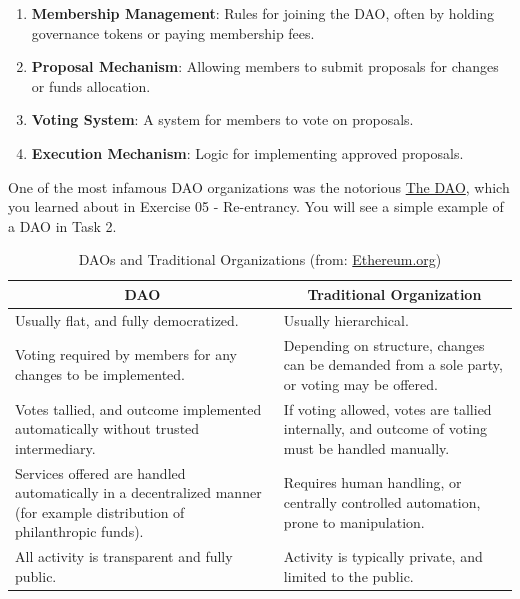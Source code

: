 \documentclass[12pt]{article}
\begin{document}
\begin{enumerate}
    \item \textbf{Membership Management}: Rules for joining the DAO, often by holding governance tokens or paying membership fees.
    \item \textbf{Proposal Mechanism}: Allowing members to submit proposals for changes or funds allocation.
    \item \textbf{Voting System}: A system for members to vote on proposals.
    \item \textbf{Execution Mechanism}: Logic for implementing approved proposals.
\end{enumerate}

\noindent
One of the most infamous DAO organizations was the notorious \href{https://en.wikipedia.org/wiki/The_DAO}{The DAO}, which you learned about in Exercise 05 - Re-entrancy. You will see a simple example of a DAO in Task 2.

\begin{table}[H]
    \centering
    \footnotesize
    \begin{tabular}{|p{}|p{}|}
        \hline
        \multicolumn{1}{|c|}{\textbf{DAO}}                                                                                      & \multicolumn{1}{c|}{\textbf{Traditional Organization}}                                           \\
        \hline
        Usually flat, and fully democratized.                                                                                   & Usually hierarchical.                                                                            \\
        \hline
        Voting required by members for any changes to be implemented.                                                           & Depending on structure, changes can be demanded from a sole party, or voting may be offered.     \\
        \hline
        Votes tallied, and outcome implemented automatically without trusted intermediary.                                      & If voting allowed, votes are tallied internally, and outcome of voting must be handled manually. \\
        \hline
        Services offered are handled automatically in a decentralized manner (for example distribution of philanthropic funds). & Requires human handling, or centrally controlled automation, prone to manipulation.              \\
        \hline
        All activity is transparent and fully public.                                                                           & Activity is typically private, and limited to the public.                                        \\
        \hline
    \end{tabular}
    \caption{DAOs and Traditional Organizations (from: \href{https://ethereum.org/dao/}{Ethereum.org})}
    \label{tab:dao-comparison}
\end{table}
\end{document}
